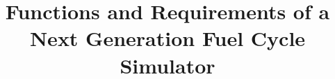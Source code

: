 \usepackage[acronym,toc]{glossaries}

\makeglossaries
\title{Functions and Requirements of a Next Generation Fuel Cycle Simulator}








\usepackage{graphicx}
\usepackage{booktabs} %
\usepackage{microtype} %
\newcommand{\units}[1] {\:\text{#1}}%
\newcommand{\SN}{S$_N$}%

\date{}








